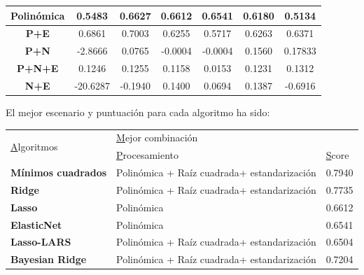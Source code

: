 \documentclass[12pt,a4paper]{article}
\begin{document}
\begin{table}[H]
\begin{tabular}{|c|c|c|c|c|c|c|}
		\textbf{Polinómica}                                                  & 0.5483   & 0.6627      & 0.6612      & 0.6541           & 0.6180           & 0.5134               \\ \hline
		\textbf{P+E}                                                         & 0.6861   & 0.7003      & 0.6255      & 0.5717           & 0.6263           & 0.6371               \\ \hline
		\textbf{P+N}                                                         & -2.8666  & 0.0765      & -0.0004     & -0.0004          & 0.1560           & 0.17833              \\ \hline
		\textbf{P+N+E}                                                       & 0.1246   & 0.1255      & 0.1158      & 0.0153           & 0.1231           & 0.1312               \\ \hline
		\textbf{N+E}                                                         & -20.6287 & -0.1940     & 0.1400      & 0.0694           & 0.1387           & -0.6916              \\ \hline
	\end{tabular}
\end{table}

El mejor escenario y puntuación para cada algoritmo ha sido:

\begin{table}[H]
	\begin{tabular}{|l|l|l|}
		\hline
		\multirow{2}{*}{{\ul Algoritmos}} & \multicolumn{2}{l|}{{\ul Mejor combinación}}              \\ \cline{2-3} 
		& {\ul Procesamiento}                         & {\ul Score} \\ \hline
		\textbf{Mínimos cuadrados}        & Polinómica + Raíz cuadrada+ estandarización & 0.7940      \\ \hline
		\textbf{Ridge}                    & Polinómica + Raíz cuadrada+ estandarización & 0.7735      \\ \hline
		\textbf{Lasso}                    & Polinómica                                  & 0.6612      \\ \hline
		\textbf{ElasticNet}               & Polinómica                                  & 0.6541      \\ \hline
		\textbf{Lasso-LARS}               & Polinómica + Raíz cuadrada+ estandarización & 0.6504      \\ \hline
		\textbf{Bayesian Ridge}           & Polinómica + Raíz cuadrada+ estandarización & 0.7204      \\ \hline
	\end{tabular}
\end{table}
\end{document}
